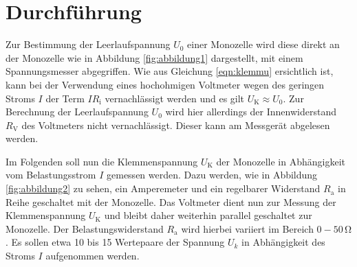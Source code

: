 
\section{Durchführung}
\label{sec:Durchführung}
Zur Bestimmung der Leerlaufspannung $U_0$ einer Monozelle wird diese direkt an der Monozelle wie in Abbildung \ref{fig:abbildung1} dargestellt, mit einem Spannungsmesser abgegriffen.
Wie aus Gleichung \eqref{eqn:klemmu} ersichtlich ist, kann bei der Verwendung eines hochohmigen Voltmeter wegen des geringen Stroms $I$ der Term $I R_{\text{i}}$ vernachlässigt werden und es gilt $U_{\text{K}} \approx U_0$.
Zur Berechnung der Leerlaufspannung $U_0$ wird hier allerdings der Innenwiderstand $R_{\text{V}}$ des Voltmeters nicht vernachlässigt. Dieser kann am Messgerät abgelesen werden.

Im Folgenden soll nun die Klemmenspannung $U_{\text{K}}$ der Monozelle in Abhängigkeit vom Belastungsstrom $I$ gemessen werden.
Dazu werden, wie in Abbildung \ref{fig:abbildung2} zu sehen, ein Amperemeter und ein regelbarer Widerstand $R_{\text{a}}$ in Reihe geschaltet mit der Monozelle. Das Voltmeter dient nun zur Messung der Klemmenspannung $U_{\text{K}}$ und bleibt daher weiterhin parallel geschaltet zur Monozelle.
Der Belastungswiderstand $R_{\text{a}}$ wird hierbei variiert im Bereich $0-50 \, \si{\ohm}$.
Es sollen etwa 10 bis 15 Wertepaare der Spannung $U_k$ in Abhängigkeit des Stroms $I$ aufgenommen werden.





